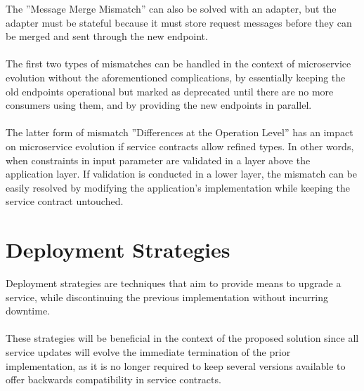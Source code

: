 The ''Message Merge Mismatch'' can also be solved with an adapter, but the adapter must be stateful because it must store request messages before they can be merged and sent through the new endpoint.

\paragraph{}

The first two types of mismatches can be handled in the context of microservice evolution without the aforementioned complications,
by essentially keeping the old endpoints operational but marked as deprecated until  there are no more consumers using them, and by providing the new endpoints in parallel.

\paragraph{}

The latter form of mismatch ''Differences at the Operation Level'' has an impact on microservice evolution if service contracts allow refined types.
In other words, when constraints in input parameter are validated in a layer above the application layer.
If validation is conducted in a lower layer, the mismatch can be easily resolved by modifying the application's implementation while keeping the service contract untouched.

\section{Deployment Strategies} %
\label{sec:deployment_strategies}

Deployment strategies are techniques that aim to provide means to upgrade a service,
while discontinuing the previous implementation without incurring downtime.

\paragraph{}

These strategies will be beneficial in the context of the proposed solution since all service updates will evolve the immediate termination of the prior implementation,
as it is no longer required to keep several versions available to offer backwards compatibility in service contracts.

\paragraph{}

